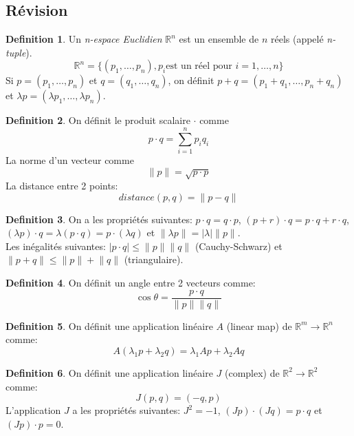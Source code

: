 \documentclass[]{book}
\theoremstyle{definition}
\newtheorem{defn}{Definition}
\newcommand{\bb}[1]{\mathbb{#1}}
\newcommand{\R}{\bb{R}}
\begin{document}
\subsection*{R\'evision}
\begin{defn}
Un \emph{n-espace Euclidien} $\R^n$ est un ensemble de $n$ r\'eels (appel\'e \emph{n-tuple}).
$$
\R^n = \{(p_1,\ldots,p_n), p_i \text{est un r\'eel pour } i = 1,\ldots,n\}
$$ 
Si $p = (p_1, \ldots, p_n)$ et $q = (q_1, \ldots, q_n)$, on d\'efinit $p+q = (p_1+q_1,\ldots,p_n+q_n)$ et $\lambda p = (\lambda p_1, \ldots, \lambda p_n)$.

\end{defn}


\begin{defn}
On d\'efinit le produit scalaire $ \cdot $ comme 
$$p \cdot q = \sum_{i=1}^{n} p_iq_i$$
La norme d'un vecteur comme
$$\lVert p \rVert = \sqrt{p \cdot p}$$
La distance entre 2 points:
$$distance(p,q) = \lVert p - q \rVert$$
\end{defn}


\begin{defn}
On a les propri\'et\'es suivantes: $p \cdot q = q \cdot p$, $(p+r) \cdot q = p \cdot q + r \cdot q$, $(\lambda p) \cdot q = \lambda(p \cdot q) = p \cdot (\lambda q)$ et $\lVert \lambda p \rVert = \lvert \lambda \rvert \lVert p \rVert$. \\
Les in\'egalit\'es suivantes: $\lvert p \cdot q \rvert \le \lVert p \rVert \lVert q \rVert$ (Cauchy-Schwarz) et $\lVert p+q \rVert \le \lVert p \rVert + \lVert q \rVert$ (triangulaire).   	  
\end{defn}

\begin{defn}
On d\'efinit un angle entre 2 vecteurs comme:
$$\cos \theta = \frac{p \cdot q}{\lVert p \rVert \lVert q \rVert}$$
\end{defn}

\begin{defn}
On d\'efinit une application lin\'eaire $A$ (linear map) de $\R^m \to \R^n$ comme:
$$A(\lambda_1 p + \lambda_2 q) = \lambda_1 Ap + \lambda_2 Aq$$
\end{defn}

\begin{defn}
On d\'efinit une application lin\'eaire $J$ (complex) de $\R^2 \to \R^2$ comme:
$$J(p,q) = (-q,p)$$
L'application $J$ a les propri\'et\'es suivantes: $J^2 = -1$, $(Jp) \cdot (Jq) = p \cdot q$ et $(Jp) \cdot p = 0$. 
\end{defn}
\end{document}

